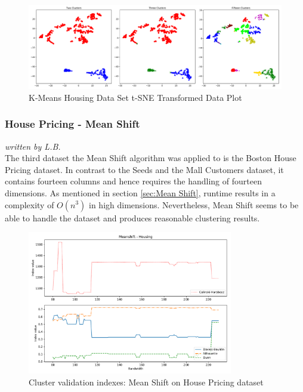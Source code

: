 \begin{figure}[H]
\begin{center}
\includegraphics[width=1.0\textwidth]{images/kmeans_housing_tsne.pdf}
\caption{K-Means Housing Data Set t-SNE Transformed Data Plot}
\end{center}
\label{fig:kmeans_housing_2d_comparison}
\end{figure}
\vspace{-0.5cm}

\subsubsection{House Pricing - Mean Shift}
\textit{written by L.B.}\\

The third dataset the Mean Shift algorithm was applied to is the Boston House Pricing dataset. In contrast to the Seeds and the Mall Customers dataset, it contains fourteen columns and hence requires the handling of fourteen dimensions. As mentioned in section \ref{sec:Mean Shift}, runtime results in a complexity of $O(n^{3})$ in high dimensions. 
Nevertheless, Mean Shift seems to be able to handle the dataset and produces reasonable clustering results. 

\begin{figure}[!ht]
\begin{center}
\includegraphics[width=0.8\textwidth]{images/Meanshift_-_Housing.pdf}
\caption{Cluster validation indexes: Mean Shift on House Pricing dataset}
\end{center}
\label{fig:meanshift_housing_indexes}
\end{figure}

